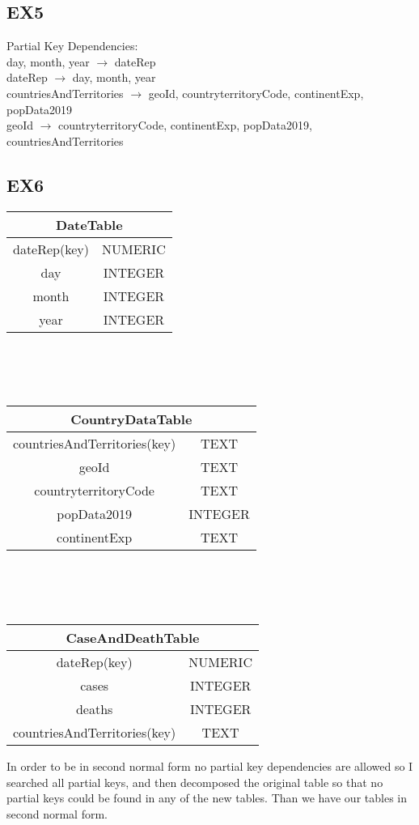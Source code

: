 \documentclass{article}
\begin{document}
\subsection{EX5}
Partial Key Dependencies: \\
day, month, year $\rightarrow$ dateRep \\
dateRep $\rightarrow$ day, month, year \\
countriesAndTerritories $\rightarrow$ geoId, countryterritoryCode, continentExp, popData2019 \\
geoId $\rightarrow$ countryterritoryCode, continentExp, popData2019, countriesAndTerritories \\

\subsection{EX6}
\begin{tabular}{|c|c|}
     \hline
     \multicolumn{2}{|c|}{DateTable} \\
     \hline dateRep(key) & NUMERIC \\
     \hline day & INTEGER \\
     \hline month & INTEGER \\
     \hline year & INTEGER \\
     \hline
\end{tabular}
\\\\\\
\begin{tabular}{|c|c|}
     \hline
     \multicolumn{2}{|c|}{CountryDataTable} \\
     \hline countriesAndTerritories(key) & TEXT \\
     \hline geoId & TEXT \\
     \hline countryterritoryCode & TEXT \\
     \hline popData2019 & INTEGER \\
     \hline continentExp & TEXT \\
     \hline
\end{tabular}
\\\\\\
\begin{tabular}{|c|c|}
     \hline
     \multicolumn{2}{|c|}{CaseAndDeathTable} \\
     \hline dateRep(key) & NUMERIC \\
     \hline cases & INTEGER \\
     \hline deaths & INTEGER \\
     \hline countriesAndTerritories(key) & TEXT \\
     \hline
\end{tabular} \par
In order to be in second normal form no partial key dependencies are allowed so I searched all partial keys, and then decomposed the original table so that no partial keys could be found in any of the new tables. Than we have our tables in second normal form.
\end{document}
